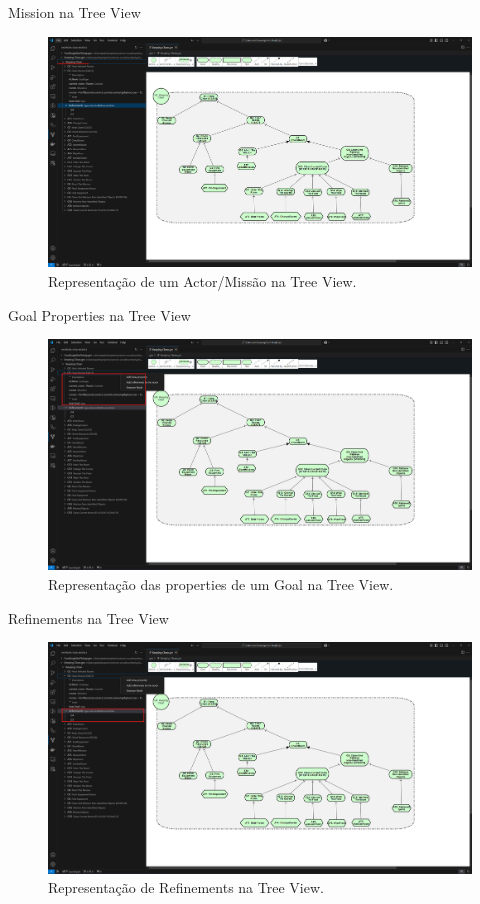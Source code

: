 \documentclass{beamer}
\begin{document}
\begin{frame}{Mission na Tree View}
  \begin{figure}[!h]
    \centering
    \includegraphics[width=1\textwidth]{missionfocus.png} 
    \caption{Representação de um Actor/Missão na Tree View.}
  \end{figure}
\end{frame}
\begin{frame}{Goal Properties na Tree View}
  \begin{figure}[!h]
    \centering
    \includegraphics[width=1\textwidth]{node properties.png} 
    \caption{Representação das properties de um Goal na Tree View.}
  \end{figure}
\end{frame}
\begin{frame}{Refinements na Tree View}
  \begin{figure}[!h]
    \centering
    \includegraphics[width=1\textwidth]{refinements.png} 
    \caption{Representação de Refinements na Tree View.}
  \end{figure}
\end{frame}
\end{document}
